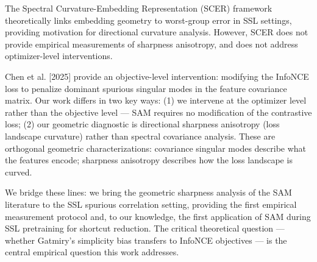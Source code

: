 The Spectral Curvature-Embedding Representation (SCER) framework \citep{park2025g2sam} theoretically links embedding geometry to worst-group error in SSL settings, providing motivation for directional curvature analysis. However, SCER does not provide empirical measurements of sharpness anisotropy, and does not address optimizer-level interventions.

Chen et al. [2025] provide an objective-level intervention: modifying the InfoNCE loss to penalize dominant spurious singular modes in the feature covariance matrix. Our work differs in two key ways: (1) we intervene at the optimizer level rather than the objective level --- SAM requires no modification of the contrastive loss; (2) our geometric diagnostic is directional sharpness anisotropy (loss landscape curvature) rather than spectral covariance analysis. These are orthogonal geometric characterizations: covariance singular modes describe what the features encode; sharpness anisotropy describes how the loss landscape is curved.

We bridge these lines: we bring the geometric sharpness analysis of the SAM literature to the SSL spurious correlation setting, providing the first empirical measurement protocol and, to our knowledge, the first application of SAM during SSL pretraining for shortcut reduction. The critical theoretical question --- whether Gatmiry's simplicity bias transfers to InfoNCE objectives --- is the central empirical question this work addresses.

\begin{table}[htbp]
\centering
{}
\end{table}

